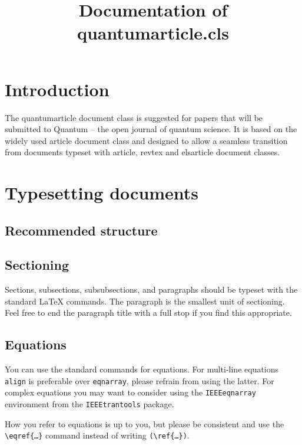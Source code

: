 \documentclass[a4paper,noarxiv,onecolumn]{quantumarticle}
\begin{document}
	\title{Documentation of quantumarticle.cls}
	\maketitle
	
	\tableofcontents
	
	\clearpage
	
	\section{Introduction}
	The quantumarticle document class is suggested for papers that will be submitted to Quantum -- the open journal of quantum science. It is based on the widely used article document class and designed to allow a seamless transition from documents typeset with article, revtex and elsarticle document classes. 
	
	\section{Typesetting documents}
	
	\subsection{Recommended structure}	
	
	\subsection{Sectioning}
	Sections, subsections, subsubsections, and paragraphs should be typeset with the standard LaTeX commands. The paragraph is the smallest unit of sectioning. Feel free to end the paragraph title with a full stop if you find this appropriate.
	
	\subsection{Equations}	
	You can use the standard commands for equations. For multi-line equations \texttt{align} is preferable over \texttt{eqnarray}, please refrain from using the latter.	For complex equations you may want to consider using the \texttt{IEEEeqnarray} environment from the \texttt{IEEEtrantools} package.
	
	How you refer to equations is up to you, but please be consistent and use the \texttt{\textbackslash{}eqref\{\dots\}} command instead of writing \texttt{(\textbackslash{}ref\{\dots\})}.
	
\end{document}
